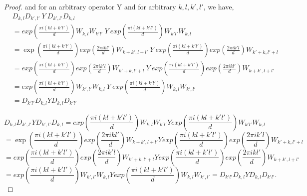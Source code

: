 \documentclass[12pt]{amsart}
\numberwithin{equation}{section}
\begin{document}
\begin{proof}
          

  and for an arbitrary operator Y and for arbitrary $k,l,k',l' $, we have,
  \begin{equation}\label{product}
      \begin{split}
&D_{k,l}D_{k',l'}~ Y~ D_{k',l'}D_{k,l}\\
&=exp \left( \frac{\pi i (kl+k'l')}{d}\right)W_{k,l}W_{k'l'}~Y~exp \left( \frac{\pi i (kl+k'l')}{d}\right)W_{k'l'}W_{k,l}\\
&=\exp \left( \frac{\pi i (kl+k'l')}{d}\right)exp \left( \frac{2\pi i kl'}{d}\right) W_{k+k',l+l'} ~Y ~exp \left( \frac{\pi i (kl+k'l')}{d}\right) exp \left( \frac{2 \pi i k'l}{d}\right)W_{k'+k,l'+l}\\
&=exp \left( \frac{\pi i (kl+k'l')}{d}\right)exp \left( \frac{2 \pi i k'l}{d}\right)W_{k'+k,l'+l}~Y~ exp \left( \frac{\pi i (kl+k'l')}{d}\right)exp \left( \frac{2\pi i kl'}{d}\right)W_{k+k',l+l'}\\
&=exp \left( \frac{\pi i (kl+k'l')}{d}\right) W_{k',l'}W_{k,l}~Y~exp \left( \frac{\pi i (kl+k'l')}{d}\right)W_{k,l}W_{k',l'}\\
&=D_{k'l'}D_{k,l}Y D_{k,l}D_{k'l'}
      \end{split}
  \end{equation}

  \iffalse
  \[D_{k,l}D_{k',l'} Y D_{k',l'}D_{k,l}=exp \left( \frac{\pi i (kl+k'l')}{d}\right)W_{k,l}W_{k'l'}Yexp \left( \frac{\pi i (kl+k'l')}{d}\right)W_{k'l'}W_{k,l} \]
\[=\exp \left( \frac{\pi i (kl+k'l')}{d}\right)exp \left( \frac{2\pi i kl'}{d}\right) W_{k+k',l+l'} Y exp \left( \frac{\pi i (kl+k'l')}{d}\right) exp \left( \frac{2 \pi i k'l}{d}\right)W_{k'+k,l'+l}\]
\[=exp \left( \frac{\pi i (kl+k'l')}{d}\right)exp \left( \frac{2 \pi i k'l}{d}\right)W_{k'+k,l'+l}Y exp \left( \frac{\pi i (kl+k'l')}{d}\right)exp \left( \frac{2\pi i kl'}{d}\right)W_{k+k',l+l'}\]
\begin{equation}\label{product}
  = exp \left( \frac{\pi i (kl+k'l')}{d}\right) W_{k',l'}W_{k,l}Yexp \left( \frac{\pi i (kl+k'l')}{d}\right)W_{k,l}W_{k',l'} =D_{k'l'}D_{k,l}Y D_{k,l}D_{k'l'} .
\end{equation}


\end{proof}
\end{document}
